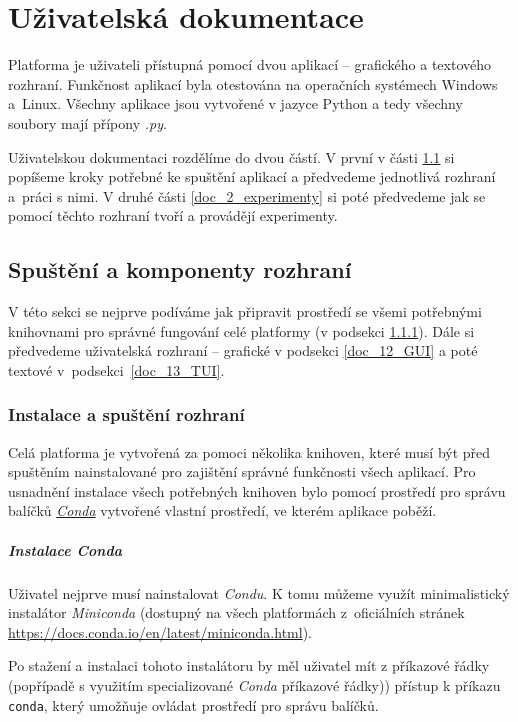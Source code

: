 \chapter{Uživatelská dokumentace}
Platforma je uživateli přístupná pomocí dvou aplikací -- grafického a textového
rozhraní. Funkčnost aplikací byla otestována na operačních systémech Windows
a~Linux. Všechny aplikace jsou vytvořené v jazyce Python a tedy všechny soubory
mají přípony \emph{.py}. 

Uživatelskou dokumentaci rozdělíme do dvou částí. V první v části
\ref{doc_1_spust_a_kompon} si popíšeme kroky potřebné ke spuštění aplikací a
předvedeme jednotlivá rozhraní a~práci s nimi. V druhé části
\ref{doc_2_experimenty} si poté předvedeme jak se pomocí těchto rozhraní tvoří
a provádějí experimenty.

\section{Spuštění a komponenty rozhraní} \label{doc_1_spust_a_kompon}

V této sekci se nejprve podíváme jak připravit prostředí se všemi potřebnými
knihovnami pro správné fungování celé platformy (v podsekci
\ref{doc_11_spust}). Dále si předvedeme uživatelská rozhraní -- grafické v
podsekci \ref{doc_12_GUI} a poté textové v~podsekci~\ref{doc_13_TUI}.

\subsection{Instalace a spuštění rozhraní} \label{doc_11_spust}
Celá platforma je vytvořená za pomoci několika knihoven, které musí být před
spuštěním nainstalované pro zajištění správné funkčnosti všech aplikací. Pro
usnadnění instalace všech potřebných knihoven bylo pomocí prostředí pro správu
balíčků \href{https://conda.org/}{\emph{Conda}} vytvořené vlastní prostředí, ve
kterém aplikace poběží. 

\paragraph{Instalace \emph{Conda}}

Uživatel nejprve musí nainstalovat \emph{Condu}. K tomu můžeme využít
minimalistický instalátor \emph{Miniconda} (dostupný na všech platformách
z~oficiálních stránek \url{https://docs.conda.io/en/latest/miniconda.html}).

Po stažení a instalaci tohoto instalátoru by měl uživatel mít z příkazové řádky
(popřípadě s využitím specializované \emph{Conda} příkazové řádky)) přístup k
příkazu \texttt{conda}, který umožňuje ovládat prostředí pro správu balíčků. 

